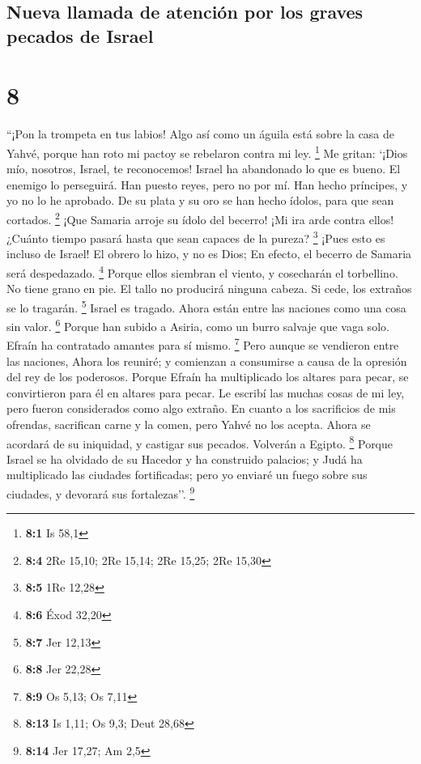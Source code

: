 \hypertarget{nueva-llamada-de-atenciuxf3n-por-los-graves-pecados-de-israel}{%
\subsection{Nueva llamada de atención por los graves pecados de
Israel}\label{nueva-llamada-de-atenciuxf3n-por-los-graves-pecados-de-israel}}

\hypertarget{section-7}{%
\section{8}\label{section-7}}

 ``¡Pon la trompeta en tus labios! Algo así como un águila
está sobre la casa de Yahvé, porque han roto mi pactoy se rebelaron
contra mi ley. \footnote{\textbf{8:1} Is 58,1}  Me gritan:
`¡Dios mío, nosotros, Israel, te reconocemos!  Israel ha
abandonado lo que es bueno. El enemigo lo perseguirá.  Han
puesto reyes, pero no por mí. Han hecho príncipes, y yo no lo he
aprobado. De su plata y su oro se han hecho ídolos, para que sean
cortados. \footnote{\textbf{8:4} 2Re 15,10; 2Re 15,14; 2Re 15,25; 2Re
  15,30}  ¡Que Samaria arroje su ídolo del becerro! ¡Mi
ira arde contra ellos! ¿Cuánto tiempo pasará hasta que sean capaces de
la pureza? \footnote{\textbf{8:5} 1Re 12,28}  ¡Pues esto
es incluso de Israel! El obrero lo hizo, y no es Dios; En efecto, el
becerro de Samaria será despedazado. \footnote{\textbf{8:6} Éxod 32,20}
 Porque ellos siembran el viento, y cosecharán el
torbellino. No tiene grano en pie. El tallo no producirá ninguna cabeza.
Si cede, los extraños se lo tragarán. \footnote{\textbf{8:7} Jer 12,13}
 Israel es tragado. Ahora están entre las naciones como
una cosa sin valor. \footnote{\textbf{8:8} Jer 22,28} 
Porque han subido a Asiria, como un burro salvaje que vaga solo. Efraín
ha contratado amantes para sí mismo. \footnote{\textbf{8:9} Os 5,13; Os
  7,11}  Pero aunque se vendieron entre las naciones,
Ahora los reuniré; y comienzan a consumirse a causa de la opresión del
rey de los poderosos.  Porque Efraín ha multiplicado los
altares para pecar, se convirtieron para él en altares para pecar.
 Le escribí las muchas cosas de mi ley, pero fueron
considerados como algo extraño.  En cuanto a los
sacrificios de mis ofrendas, sacrifican carne y la comen, pero Yahvé no
los acepta. Ahora se acordará de su iniquidad, y castigar sus pecados.
Volverán a Egipto. \footnote{\textbf{8:13} Is 1,11; Os 9,3; Deut 28,68}
 Porque Israel se ha olvidado de su Hacedor y ha
construido palacios; y Judá ha multiplicado las ciudades fortificadas;
pero yo enviaré un fuego sobre sus ciudades, y devorará sus
fortalezas''. \footnote{\textbf{8:14} Jer 17,27; Am 2,5}

